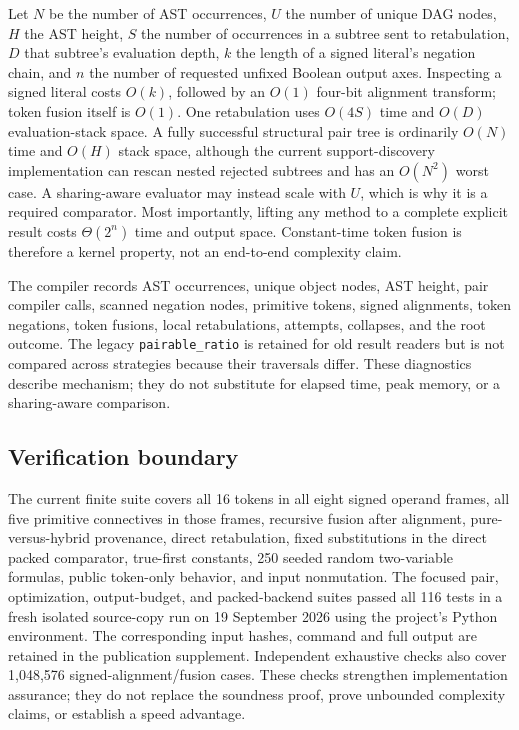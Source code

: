 \documentclass[11pt]{article}
\begin{document}
Let $N$ be the number of AST occurrences, $U$ the number of unique DAG nodes,
$H$ the AST height, $S$ the number of occurrences in a subtree sent to
retabulation, $D$ that subtree's evaluation depth, $k$ the length of a signed
literal's negation chain, and $n$ the number of requested unfixed Boolean
output axes. Inspecting a signed literal costs $O(k)$, followed by an $O(1)$
four-bit alignment transform; token fusion itself is $O(1)$. One retabulation
uses $O(4S)$ time and $O(D)$ evaluation-stack space. A fully successful
structural pair tree is ordinarily $O(N)$ time and $O(H)$ stack space, although
the current support-discovery implementation can rescan nested rejected
subtrees and has an $O(N^2)$ worst case. A sharing-aware evaluator may instead
scale with $U$, which is why it is a required comparator. Most importantly,
lifting any method to a complete explicit result costs $\Theta(2^n)$ time and
output space.
Constant-time token fusion is therefore a kernel property, not an end-to-end
complexity claim.

The compiler records AST occurrences, unique object nodes, AST height, pair
compiler calls, scanned negation nodes, primitive tokens, signed alignments,
token negations, token fusions, local retabulations, attempts, collapses, and
the root outcome. The legacy \texttt{pairable\_ratio} is retained for old
result readers but is not compared across strategies because their traversals
differ. These diagnostics describe mechanism; they do not substitute for
elapsed time, peak memory, or a sharing-aware comparison.

\subsection{Verification boundary}

The current finite suite covers all 16 tokens in all eight signed operand
frames, all five primitive connectives in those frames, recursive fusion after
alignment, pure-versus-hybrid provenance, direct retabulation, fixed
substitutions in the direct packed comparator, true-first constants, 250 seeded
random two-variable formulas, public token-only behavior, and input
nonmutation. The focused pair, optimization, output-budget, and packed-backend
suites passed all 116 tests in a fresh isolated source-copy run on 19 September
2026 using the project's Python environment. The corresponding input hashes,
command and full output are retained in the publication supplement.
Independent exhaustive checks also cover 1,048,576 signed-alignment/fusion
cases. These checks strengthen implementation assurance; they do not replace
the soundness proof, prove unbounded complexity claims, or establish a speed
advantage.
\end{document}
